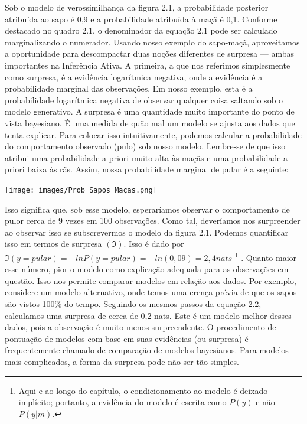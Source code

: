 \documentclass[
  12pt,
]{book}
\begin{document}
Sob o modelo de verossimilhança da figura 2.1, a probabilidade posterior atribuída ao sapo é 0,9 e a probabilidade atribuída à maçã é 0,1. Conforme destacado no quadro 2.1, o denominador da equação 2.1 pode ser calculado marginalizando o numerador. Usando nosso exemplo do sapo-maçã, aproveitamos a oportunidade para descompactar duas noções diferentes de surpresa --- ambas importantes na Inferência Ativa. A primeira, a que nos referimos simplesmente como surpresa, é a evidência logarítmica negativa, onde a evidência é a probabilidade marginal das observações. Em nosso exemplo, esta é a probabilidade logarítmica negativa de observar qualquer coisa saltando sob o modelo generativo. A surpresa é uma quantidade muito importante do ponto de vista bayesiano. É uma medida de quão mal um modelo se ajusta aos dados que tenta explicar. Para colocar isso intuitivamente, podemos calcular a probabilidade do comportamento observado (pulo) sob nosso modelo. Lembre-se de que isso atribui uma probabilidade a priori muito alta às maçãs e uma probabilidade a priori baixa às rãs. Assim, nossa probabilidade marginal de pular é a seguinte:

\texttt{[image: images/Prob Sapos Maças.png]}

Isso significa que, sob esse modelo, esperaríamos observar o comportamento de pulor cerca de 9 vezes em 100 observações. Como tal, deveríamos nos surpreender ao observar isso se subscrevermos o modelo da figura 2.1. Podemos quantificar isso em termos de surpresa \((ℑ)\). Isso é dado por \(ℑ(y=pular) = −lnP(y=pular) = −ln(0,09) = 2,4 nats\) \footnote{Aqui e ao longo do capítulo, o condicionamento ao modelo é deixado
  implícito; portanto, a evidência do modelo é escrita como \(P(y)\) e
  não \(P(y|m)\).} . Quanto maior esse número, pior o modelo como explicação adequada para as observações em questão. Isso nos permite comparar modelos em relação aos dados. Por exemplo, considere um modelo alternativo, onde temos uma crença prévia de que os sapos são vistos 100\% do tempo. Seguindo os mesmos passos da equação 2.2, calculamos uma surpresa de cerca de 0,2 nats. Este é um modelo melhor desses dados, pois a observação é muito menos surpreendente. O procedimento de pontuação de modelos com base em suas evidências (ou surpresa) é frequentemente chamado de comparação de modelos bayesianos. Para modelos mais complicados, a forma da surpresa pode não ser tão simples.
\end{document}
